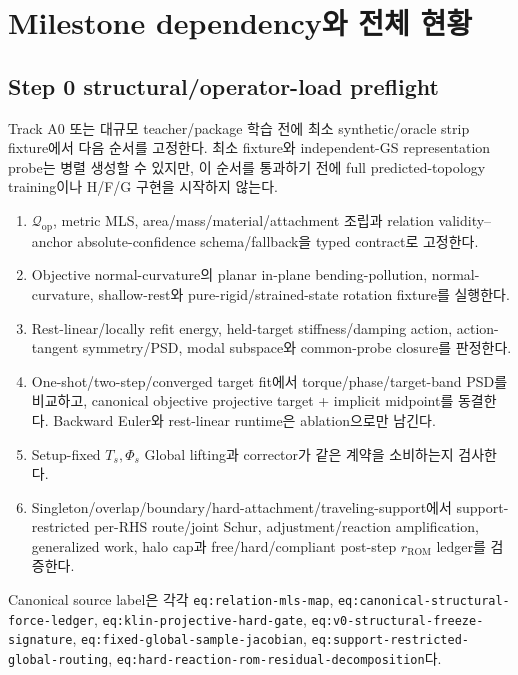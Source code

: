 \documentclass[10pt,a4paper]{article}
\newcommand{\code}[1]{\texttt{#1}}
\begin{document}
\section{Milestone dependency와 전체 현황}

\subsection{Step 0 structural/operator-load preflight}

Track A0 또는 대규모 teacher/package 학습 전에 최소 synthetic/oracle strip fixture에서
다음 순서를 고정한다. 최소 fixture와 independent-GS representation probe는 병렬 생성할 수 있지만,
이 순서를 통과하기 전에 full predicted-topology training이나 H/F/G 구현을 시작하지 않는다.

\begin{enumerate}
  \item \(\mathcal Q_{\mathrm{op}}\), metric MLS, area/mass/material/attachment 조립과
  relation validity--anchor absolute-confidence schema/fallback을 typed contract로 고정한다.
  \item Objective normal-curvature의 planar in-plane bending-pollution,
  normal-curvature, shallow-rest와 pure-rigid/strained-state rotation fixture를 실행한다.
  \item Rest-linear/locally refit energy, held-target stiffness/damping action,
  action-tangent symmetry/PSD, modal subspace와 common-probe closure를 판정한다.
  \item One-shot/two-step/converged target fit에서 torque/phase/target-band PSD를 비교하고,
  canonical objective projective target + implicit midpoint를 동결한다.
  Backward Euler와 rest-linear runtime은 ablation으로만 남긴다.
  \item Setup-fixed \(T_s,\Phi_s\) Global lifting과 corrector가 같은 계약을 소비하는지 검사한다.
  \item Singleton/overlap/boundary/hard-attachment/traveling-support에서
  support-restricted per-RHS route/joint Schur, adjustment/reaction amplification,
  generalized work, halo cap과 free/hard/compliant post-step \(r_{\mathrm{ROM}}\) ledger를 검증한다.
\end{enumerate}

Canonical source label은 각각
\code{eq:relation-mls-map}, \code{eq:canonical-structural-force-ledger},
\code{eq:klin-projective-hard-gate}, \code{eq:v0-structural-freeze-signature},
\code{eq:fixed-global-sample-jacobian}, \code{eq:support-restricted-global-routing},
\code{eq:hard-reaction-rom-residual-decomposition}다.
\end{document}
